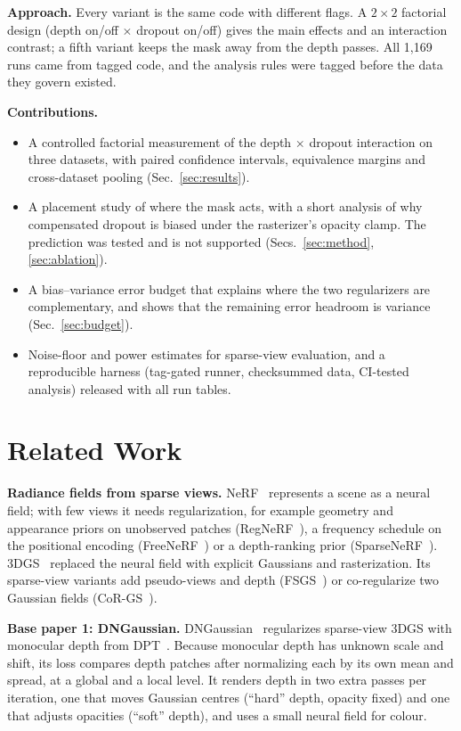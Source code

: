 \documentclass[conference]{IEEEtran}
\begin{document}
\textbf{Approach.} Every variant is the same code with different flags. A $2\times2$ factorial design (depth on/off $\times$ dropout on/off) gives the main effects and an interaction contrast; a fifth variant keeps the mask away from the depth passes. All 1,169 runs came from tagged code, and the analysis rules were tagged before the data they govern existed.

\textbf{Contributions.}
\begin{itemize}
\item A controlled factorial measurement of the depth $\times$ dropout interaction on three datasets, with paired confidence intervals, equivalence margins and cross-dataset pooling (Sec.~\ref{sec:results}).
\item A placement study of where the mask acts, with a short analysis of why compensated dropout is biased under the rasterizer's opacity clamp. The prediction was tested and is not supported (Secs.~\ref{sec:method}, \ref{sec:ablation}).
\item A bias--variance error budget that explains where the two regularizers are complementary, and shows that the remaining error headroom is variance (Sec.~\ref{sec:budget}).
\item Noise-floor and power estimates for sparse-view evaluation, and a reproducible harness (tag-gated runner, checksummed data, CI-tested analysis) released with all run tables.
\end{itemize}

\section{Related Work}
\textbf{Radiance fields from sparse views.} NeRF~\cite{mildenhall2020nerf} represents a scene as a neural field; with few views it needs regularization, for example geometry and appearance priors on unobserved patches (RegNeRF~\cite{niemeyer2022regnerf}), a frequency schedule on the positional encoding (FreeNeRF~\cite{yang2023freenerf}) or a depth-ranking prior (SparseNeRF~\cite{wang2023sparsenerf}). 3DGS~\cite{kerbl2023gaussian} replaced the neural field with explicit Gaussians and rasterization. Its sparse-view variants add pseudo-views and depth (FSGS~\cite{zhu2024fsgs}) or co-regularize two Gaussian fields (CoR-GS~\cite{zhang2024corgs}).

\textbf{Base paper 1: DNGaussian.} DNGaussian~\cite{li2024dngaussian} regularizes sparse-view 3DGS with monocular depth from DPT~\cite{ranftl2021dpt}. Because monocular depth has unknown scale and shift, its loss compares depth patches after normalizing each by its own mean and spread, at a global and a local level. It renders depth in two extra passes per iteration, one that moves Gaussian centres (``hard'' depth, opacity fixed) and one that adjusts opacities (``soft'' depth), and uses a small neural field for colour.
\end{document}
